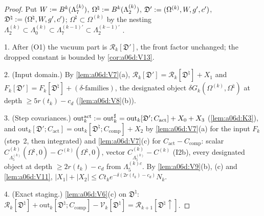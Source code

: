 \begin{proof}
Put $W:= B^k(\Lambda^{(k)}_7)$, $\Omega^\natural:= B^k(\Lambda^{(k)}_2)$, $\mathfrak D':=(\Omega^{(k)},W,g',c')$, $\mathfrak D^\natural:=(\Omega^\natural,W,g',c')$; $\Omega^\natural\subset\Omega^{(k)}$ by the nesting $\Lambda^{(k)}_2\subset\Lambda^{(k)}_0\subset\Lambda^{(k-1)'}_7\subset\Lambda^{(k-1)'}_2$ \cite[p.~570]{Ba2}.

1. After (O1) the vacuum part is $\mathcal R_k[\mathfrak D']$, the front factor unchanged; the dropped constant is bounded by \cref{cor:a06d:V13}.

2. (Input domain.) By \cref{lem:a06d:V7}(a), $\mathcal R_k[\mathfrak D']=\mathcal R_k[\mathfrak D^\natural]+X_1$ and $F_k[\mathfrak D']=F_k[\mathfrak D^\natural]+(\delta\text{-families})$, the designated object $\delta G_k(\Omega^{(k)},\Omega^\natural)$ at depth $\ge5r(t_k)-c_d$ (\cref{lem:a06d:V8}(b)).

3. (Step covariances.) $\mathrm{out}^{\mathrm{act}}_k:=\mathrm{out}^\sharp_k=\mathrm{out}_k[\mathfrak D';C_{\mathrm{act}}]+X_0+X_3$ (\cref{lem:a06d:K3}), and $\mathrm{out}_k[\mathfrak D';C_{\mathrm{act}}]=\mathrm{out}_k[\mathfrak D^\natural;C_{\mathrm{comp}}]+X_2$ by \cref{lem:a06d:V7}(a) for the input $F_k$ (step~2, then integrated) and \cref{lem:a06d:V7}(c) for $C_{\mathrm{act}}-C_{\mathrm{comp}}$: scalar $C^{(k)}_{\Lambda^{(k)}_5}(\Omega^\natural,0)-C^{(k)}(\Omega^\natural,0)$, vector $C^{(k)}_{\Lambda^{(k)}_5}-C^{(k)}$ (I2b), every designated object at depth $\ge2r(t_k)-c_d$ from $\Lambda^{(k)c}_5$. By \cref{lem:a06d:V9}(b), (c) and \cref{lem:a06d:V11}, $|X_1|+|X_2|\le Ct_ke^{-\delta(2r(t_k)-c_d)}N_k$.

4. (Exact staging.) \cref{lem:a06d:V6}(c) on $\mathfrak D^\natural$: $\mathcal R_k[\mathfrak D^\natural]+\mathrm{out}_k[\mathfrak D^\natural;C_{\mathrm{comp}}]-\mathcal V_k[\mathfrak D^\natural]=\mathcal R_{k+1}[\mathfrak D^\natural\!\uparrow]$.


\end{proof}
